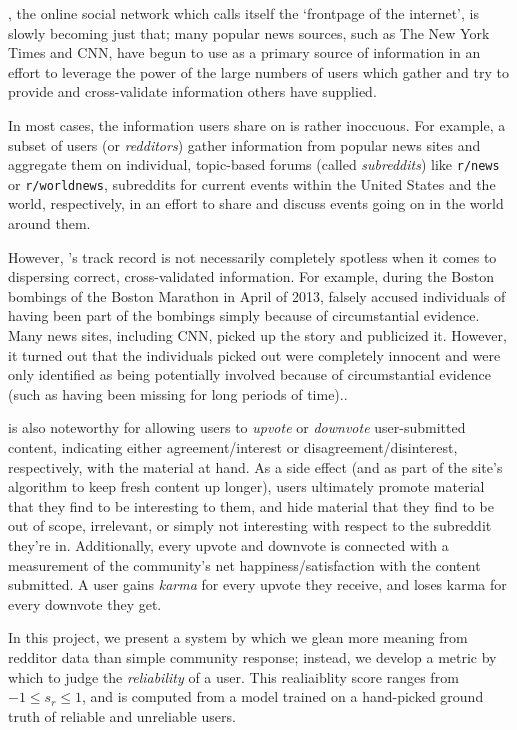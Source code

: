 \reddit{}, the online social network which calls itself the `frontpage of the
internet', is slowly becoming just that; many popular news sources, such as The
New York Times and CNN, have begun to use \reddit{} as a primary source of
information in an effort to leverage the power of the large numbers of users
which gather and try to provide and cross-validate information others have
supplied.

In most cases, the information users share on \reddit{} is rather inoccuous. For
example, a subset of \reddit{} users (or \textit{redditors}) gather information
from popular news sites and aggregate them on individual, topic-based forums
(called \textit{subreddits}) like \texttt{r/news} or \texttt{r/worldnews},
subreddits for current events within the United States and the world,
respectively, in an effort to share and discuss events going on in the world
around them.

However, \reddit{}'s track record is not necessarily completely spotless when it
comes to dispersing correct, cross-validated information. For example, during
the Boston bombings of the Boston Marathon in April of 2013, \reddit{} falsely
accused individuals of having been part of the bombings simply because of
circumstantial evidence. Many news sites, including CNN, picked up the story and
publicized it. However, it turned out that the individuals \reddit{} picked out
were completely innocent and were only identified as being potentially involved
because of circumstantial evidence (such as having been missing for long periods
of time).\cite{Potts:2013:IRC:2507065.2507079}.

\reddit{} is also noteworthy for allowing users to \textit{upvote} or
\textit{downvote} user-submitted content, indicating either agreement/interest
or disagreement/disinterest, respectively, with the material at hand. As a side
effect (and as part of the site's algorithm to keep fresh content up longer),
users ultimately promote material that they find to be interesting to them, and
hide material that they find to be out of scope, irrelevant, or simply not
interesting with respect to the subreddit they're
in.\cite{Gilbert:2013:WUR:2441776.2441866} Additionally, every upvote and
downvote is connected with a measurement of the community's net
happiness/satisfaction with the content submitted. A user gains \textit{karma}
for every upvote they receive, and loses karma for every downvote they get.

In this project, we present a system by which we glean more meaning from
redditor data than simple community response; instead, we develop a metric by
which to judge the \textit{reliability} of a user. This realiaiblity score
ranges from $-1 \leq s_r \leq 1$, and is computed from a model trained on a
hand-picked ground truth of reliable and unreliable users.
